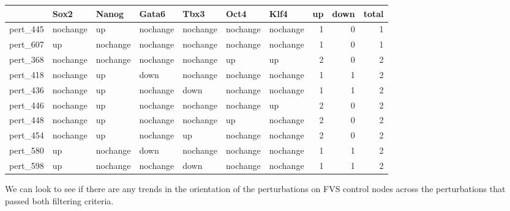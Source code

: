 \documentclass[
]{book}
\begin{document}
\begin{tabular}{l|l|l|l|l|l|l||>{}r|r|r}
\hline
  & Sox2 & Nanog & Gata6 & Tbx3 & Oct4 & Klf4 & up & down & total\\
\hline
pert\_445 & nochange & up & nochange & nochange & nochange & nochange & 1 & 0 & 1\\
\hline
pert\_607 & up & nochange & nochange & nochange & nochange & nochange & 1 & 0 & 1\\
\hline
pert\_368 & nochange & nochange & nochange & nochange & up & up & 2 & 0 & 2\\
\hline
pert\_418 & nochange & up & down & nochange & nochange & nochange & 1 & 1 & 2\\
\hline
pert\_436 & nochange & up & nochange & down & nochange & nochange & 1 & 1 & 2\\
\hline
pert\_446 & nochange & up & nochange & nochange & nochange & up & 2 & 0 & 2\\
\hline
pert\_448 & nochange & up & nochange & nochange & up & nochange & 2 & 0 & 2\\
\hline
pert\_454 & nochange & up & nochange & up & nochange & nochange & 2 & 0 & 2\\
\hline
pert\_580 & up & nochange & down & nochange & nochange & nochange & 1 & 1 & 2\\
\hline
pert\_598 & up & nochange & nochange & down & nochange & nochange & 1 & 1 & 2\\
\hline
\end{tabular}

We can look to see if there are any trends in the orientation of the perturbations on FVS control nodes across the perturbations that passed both filtering criteria.
\end{document}
